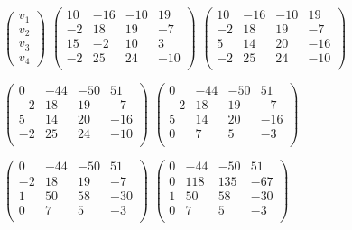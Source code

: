 \documentclass[10pt]{article}
\begin{document}
\begin{figure}[H]
\raggedright
$\begin{pmatrix}
v_1 \\
v_2 \\
v_3 \\
v_4
\end{pmatrix}$
\text{ = }
$\begin{pmatrix}
10 & -16 & -10 & 19 \\
-2 & 18 & 19 & -7 \\
15 & -2 & 10 & 3 \\
-2 & 25 & 24 & -10 \\
\end{pmatrix}$
\text{ = }
$\begin{pmatrix}
10 & -16 & -10 & 19 \\
-2 & 18 & 19 & -7 \\
5 & 14 & 20 & -16 \\
-2 & 25 & 24 & -10 \\
\end{pmatrix}$
\text{ = }

\text{ = }
$\begin{pmatrix}
0 & -44 & -50 & 51 \\
-2 & 18 & 19 & -7 \\
5 & 14 & 20 & -16 \\
-2 & 25 & 24 & -10 \\
\end{pmatrix}$
\text{ = }
$\begin{pmatrix}
0 & -44 & -50 & 51 \\
-2 & 18 & 19 & -7 \\
5 & 14 & 20 & -16 \\
0 & 7 & 5 & -3 \\
\end{pmatrix}$
\text{ = }

\text{ = }
$\begin{pmatrix}
0 & -44 & -50 & 51 \\
-2 & 18 & 19 & -7 \\
1 & 50 & 58 & -30 \\
0 & 7 & 5 & -3 \\
\end{pmatrix}$
\text{ = }
$\begin{pmatrix}
0 & -44 & -50 & 51 \\
0 & 118 & 135 & -67 \\
1 & 50 & 58 & -30 \\
0 & 7 & 5 & -3 \\
\end{pmatrix}$
\text{ = }


\end{figure}
\end{document}
